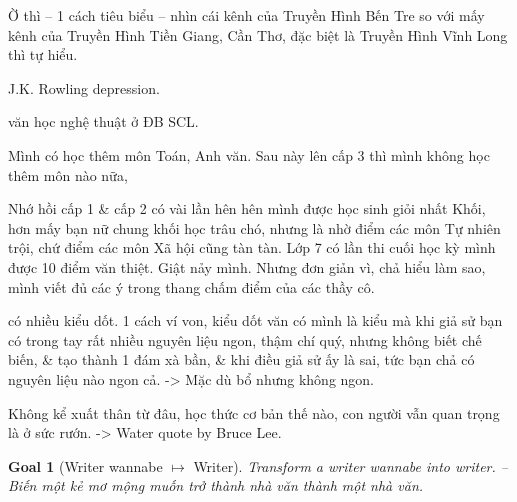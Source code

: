 \documentclass[12pt,twoside]{book}
\newtheorem{goal}{Goal}
\begin{document}
Ờ thì -- 1 cách tiêu biểu -- nhìn cái kênh của Truyền Hình Bến Tre so với mấy kênh của Truyền Hình Tiền Giang, Cần Thơ, đặc biệt là Truyền Hình Vĩnh Long thì tự hiểu.

J.K. Rowling depression.

văn học nghệ thuật ở ĐB SCL.



Mình có học thêm môn Toán, Anh văn. Sau này lên cấp 3 thì mình không học thêm môn nào nữa, 

Nhớ hồi cấp 1 \& cấp 2 có vài lần hên hên mình được học sinh giỏi nhất Khối, hơn mấy bạn nữ chung khối học trâu chó, nhưng là nhờ điểm các môn Tự nhiên trội, chứ điểm các môn Xã hội cũng tàn tàn. Lớp 7 có lần thi cuối học kỳ mình được 10 điểm văn thiệt. Giật nảy mình. Nhưng đơn giản vì, chả hiểu làm sao, mình viết đủ các ý trong thang chấm điểm của các thầy cô.

có nhiều kiểu dốt. 1 cách ví von, kiểu dốt văn có mình là kiểu mà khi giả sử bạn có trong tay rất nhiều nguyên liệu ngon, thậm chí quý, nhưng không biết chế biến, \& tạo thành 1 đám xà bần, \& khi điều giả sử ấy là sai, tức bạn chả có nguyên liệu nào ngon cả. -> Mặc dù bổ nhưng không ngon.

Không kể xuất thân từ đâu, học thức cơ bản thế nào, con người vẫn quan trọng là ở sức rướn. -> Water quote by {\sc Bruce Lee}.

\begin{goal}[Writer wannabe $\mapsto$ Writer]
	Transform a writer wannabe into writer. -- Biến một kẻ mơ mộng muốn trở thành nhà văn thành một nhà văn.
\end{goal}
\end{document}
